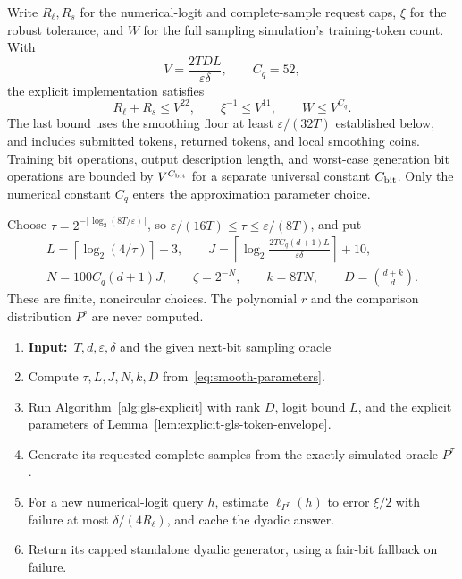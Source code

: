 \documentclass[11pt]{article}
\newenvironment{algorithmic}[1][1]
{\begin{enumerate}[label=\arabic*:,leftmargin=2em,itemsep=3pt]}
{\end{enumerate}}
\newcommand{\Require}{\item[]\textbf{Input:}\ }
\newcommand{\State}{\item}
\theoremstyle{definition}
\theoremstyle{remark}
\begin{document}
Write $R_\ell,R_s$ for the numerical-logit and complete-sample request caps, $\xi$ for the robust tolerance, and $W$ for the full sampling simulation's training-token count. With
\begin{equation}\label{eq:gls-polynomial-envelope}
V=\frac{2TDL}{\varepsilon\delta},\qquad C_q=52,
\end{equation}
the explicit implementation satisfies
\[
R_\ell+R_s\le V^{22},\qquad \xi^{-1}\le V^{11},\qquad
W\le V^{C_q}.
\]
The last bound uses the smoothing floor at least $\varepsilon/(32T)$ established below, and includes submitted tokens, returned tokens, and local smoothing coins. Training bit operations, output description length, and worst-case generation bit operations are bounded by $V^{C_{\rm bit}}$ for a separate universal constant $C_{\rm bit}$. Only the numerical constant $C_q$ enters the approximation parameter choice.

Choose
$\tau=2^{-\lceil\log_2(8T/\varepsilon)\rceil}$, so
$\varepsilon/(16T)\le\tau\le\varepsilon/(8T)$, and put
\begin{equation}\label{eq:smooth-parameters}
\begin{gathered}
L=\left\lceil\log_2(4/\tau)\right\rceil+3,\qquad
J=\left\lceil\log_2\frac{2TC_q(d+1)L}{\varepsilon\delta}\right\rceil+10,\\
N=100C_q(d+1)J,\qquad
\zeta=2^{-N},\qquad k=8TN,\qquad D=\binom{d+k}{d}.
\end{gathered}
\end{equation}
These are finite, noncircular choices. The polynomial $r$ and the comparison distribution $P^\circ$ are never computed.

\begin{algorithm}[H]
\caption{Fixed-rank learning from sampled tokens}\label{alg:fixed}
\begin{algorithmic}[1]
\Require $T,d,\varepsilon,\delta$ and the given next-bit sampling oracle
\State Compute $\tau,L,J,N,k,D$ from~\eqref{eq:smooth-parameters}.
\State Run Algorithm~\ref{alg:gls-explicit} with rank $D$, logit bound $L$, and the explicit parameters of Lemma~\ref{lem:explicit-gls-token-envelope}.
\State Generate its requested complete samples from the exactly simulated oracle $P^\tau$.
\State For a new numerical-logit query $h$, estimate $\ell_{P^\tau}(h)$ to error $\xi/2$
       with failure at most $\delta/(4R_\ell)$, and cache the dyadic answer.
\State Return its capped standalone dyadic generator, using a fair-bit fallback on failure.
\end{algorithmic}
\end{algorithm}
\end{document}
